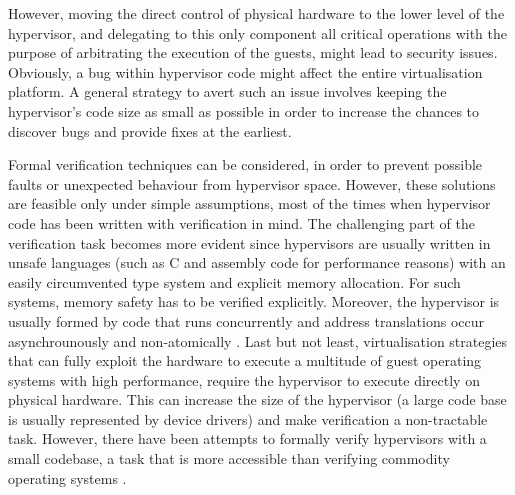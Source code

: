 However, moving the direct control of physical hardware to the lower level of the hypervisor, and delegating to this only component all critical operations with the purpose of arbitrating the execution of the guests, might lead to security issues. Obviously, a bug within hypervisor code might affect the entire virtualisation platform. 
A general strategy to avert such an issue involves keeping the hypervisor's code size as small as possible in order to increase the chances to discover bugs and provide fixes at the earliest.
 
Formal verification techniques can be considered, in order to prevent possible faults or unexpected behaviour from hypervisor space. However, these solutions are feasible only under simple assumptions, most of the times when hypervisor code has been written with verification in mind. 
The challenging part of the verification task becomes more evident since hypervisors are usually written in unsafe languages (such as C and assembly code for performance reasons) with an easily circumvented type system and explicit memory allocation. For such systems, memory safety has to be verified explicitly. Moreover, the hypervisor is usually formed by code that runs concurrently and address translations occur asynchrounously and non-atomically \cite{formalmethods,verifyhyperv}.  
Last but not least, virtualisation strategies that can fully exploit the hardware to execute a multitude of guest operating systems with high performance, require the hypervisor to execute directly on physical hardware. This can increase the size of the hypervisor (a large code base is usually represented by device drivers) and make verification a non-tractable task. However, there have been attempts to formally verify hypervisors with a small codebase, a task that is more accessible than verifying commodity operating systems \cite{hyperv, formsecxenon}.   


